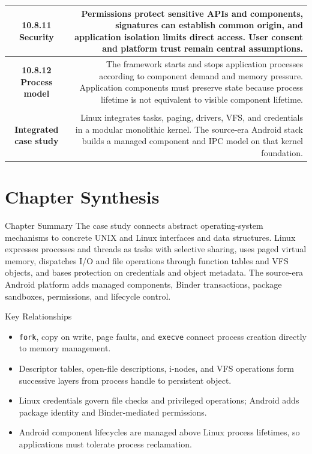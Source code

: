 \documentclass[10pt,letterpaper]{article}
\begin{document}
\begin{longtable}{C N}
\textbf{10.8.11 Security} & Permissions protect sensitive APIs and components, signatures can establish common origin, and application isolation limits direct access. User consent and platform trust remain central assumptions.\\\hline
\textbf{10.8.12 Process model} & The framework starts and stops application processes according to component demand and memory pressure. Application components must preserve state because process lifetime is not equivalent to visible component lifetime.\\\hline
{}\\*\hline
\textbf{Integrated case study} & Linux integrates tasks, paging, drivers, VFS, and credentials in a modular monolithic kernel. The source-era Android stack builds a managed component and IPC model on that kernel foundation.\\\hline
\end{longtable}
\normalsize

\section*{Chapter Synthesis}
\begin{studybox}{Chapter Summary}
The case study connects abstract operating-system mechanisms to concrete UNIX and Linux interfaces and data structures. Linux expresses processes and threads as tasks with selective sharing, uses paged virtual memory, dispatches I/O and file operations through function tables and VFS objects, and bases protection on credentials and object metadata. The source-era Android platform adds managed components, Binder transactions, package sandboxes, permissions, and lifecycle control.
\end{studybox}

\begin{studybox}{Key Relationships}
\begin{itemize}
  \item \texttt{fork}, copy on write, page faults, and \texttt{execve} connect process creation directly to memory management.
  \item Descriptor tables, open-file descriptions, i-nodes, and VFS operations form successive layers from process handle to persistent object.
  \item Linux credentials govern file checks and privileged operations; Android adds package identity and Binder-mediated permissions.
  \item Android component lifecycles are managed above Linux process lifetimes, so applications must tolerate process reclamation.
\end{itemize}
\end{studybox}
\end{document}
